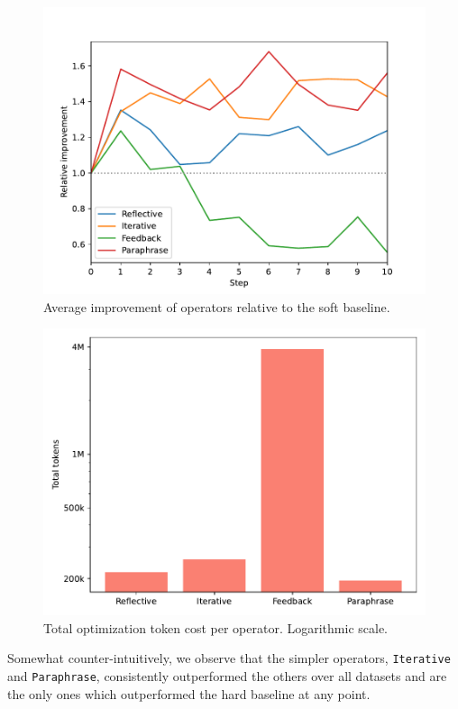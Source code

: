 \begin{figure}
    \includegraphics[width=\linewidth]{relative.pdf}
    \caption{Average improvement of operators relative to the soft baseline.}
    \label{fig:relative}
\end{figure}

\begin{figure}
    \includegraphics[width=\linewidth]{usage.pdf}
    \caption{Total optimization token cost per operator. Logarithmic scale.}
    \label{fig:usage}
\end{figure}

Somewhat counter-intuitively, we observe that the simpler operators, \texttt{Iterative} and \texttt{Paraphrase},
consistently outperformed the others over all datasets and are the only ones which outperformed the hard baseline at any point.

